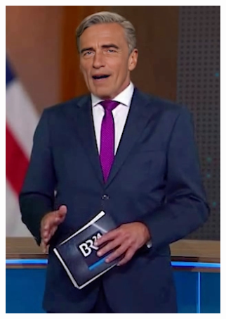 \documentclass[
  a4paper,  %
  twoside,  %
  bibliography=totoc,
  headsepline,
  cleardoublepage=empty,
  parskip=half,
  draft=false
]{scrbook}
\begin{document}
\begin{figure}[h]
  \centering
  \begin{subfigure}[b]{0.4\textwidth}
    \includegraphics[width=\textwidth]{./graphics/scheider-real.png}
  \end{subfigure}
  \hfill
  \begin{subfigure}[b]{0.4\textwidth}

\end{subfigure}
\end{figure}
\end{document}
